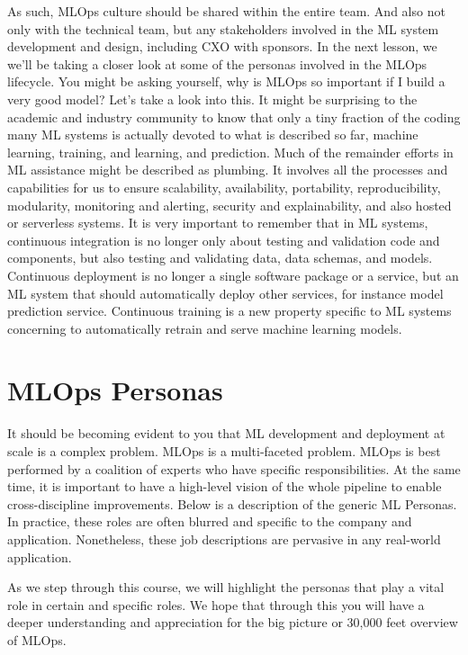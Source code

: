 As such, MLOps culture should be shared within the entire team.
And also not only with the technical team,
but any stakeholders involved in the ML system development and design,
including CXO with sponsors.
In the next lesson, we we'll be taking a closer look
at some of the personas involved in the MLOps lifecycle.
You might be asking yourself, why is MLOps so
important if I build a very good model?
Let's take a look into this.
It might be surprising to the academic and industry community
to know that only a tiny fraction of the coding many ML systems
is actually devoted to what is described so far, machine learning, training,
and learning, and prediction.
Much of the remainder efforts in ML assistance
might be described as plumbing.
It involves all the processes and capabilities for us
to ensure scalability, availability, portability, reproducibility,
modularity, monitoring and alerting, security and explainability,
and also hosted or serverless systems.
It is very important to remember that in ML systems,
continuous integration is no longer only about testing and validation
code and components, but also testing and validating
data, data schemas, and models.
Continuous deployment is no longer a single software package or a service,
but an ML system that should automatically deploy other services,
for instance model prediction service.
Continuous training is a new property specific to ML systems concerning
to automatically retrain and serve machine learning models.

\section{MLOps Personas}


It should be becoming evident to you that ML development and deployment at scale is a complex problem. MLOps is a multi-faceted problem. MLOps is best performed by a coalition of experts who have specific responsibilities. At the same time, it is important to have a high-level vision of the whole pipeline to enable cross-discipline improvements. Below is a description of the generic ML Personas. In practice, these roles are often blurred and specific to the company and application. Nonetheless, these job descriptions are pervasive in any real-world application.

As we step through this course, we will highlight the personas that play a vital role in certain and specific roles. We hope that through this you will have a deeper understanding and appreciation for the big picture or 30,000 feet overview of MLOps.

